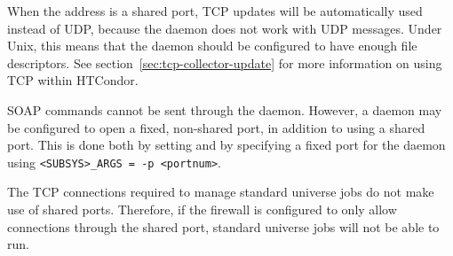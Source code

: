 When the  address is a shared port,
TCP updates will be automatically used instead of UDP,
because the  daemon does not work with UDP messages.
Under Unix, this means that the
 daemon should be configured to have enough file descriptors.
See section~\ref{sec:tcp-collector-update} for more information on using
TCP within HTCondor.

SOAP commands cannot be sent through the  daemon.
However, a daemon may be configured to open a fixed, non-shared port,
in addition to using a shared port.
This is done both by setting
 and by specifying a fixed port for the daemon
using \verb|<SUBSYS>_ARGS = -p <portnum>|.

The TCP connections required to manage standard universe jobs do not
make use of shared ports.  Therefore, if the firewall is configured to
only allow connections through the shared port, standard universe jobs
will not be able to run.


